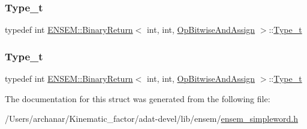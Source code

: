 \mbox{\label{structENSEM_1_1BinaryReturn_3_01int_00_01int_00_01OpBitwiseAndAssign_01_4_a0dd17e33f27d41964bcaa781f8d58aca}} 
\subsubsection{\texorpdfstring{Type\_t}{Type\_t}\hspace{0.1cm}{\footnotesize\ttfamily [2/3]}}
{\footnotesize\ttfamily typedef int \mbox{\hyperlink{structENSEM_1_1BinaryReturn}{E\+N\+S\+E\+M\+::\+Binary\+Return}}$<$ int, int, \mbox{\hyperlink{structENSEM_1_1OpBitwiseAndAssign}{Op\+Bitwise\+And\+Assign}} $>$\+::\mbox{\hyperlink{structENSEM_1_1BinaryReturn_3_01int_00_01int_00_01OpBitwiseAndAssign_01_4_a0dd17e33f27d41964bcaa781f8d58aca}{Type\+\_\+t}}}

\mbox{\label{structENSEM_1_1BinaryReturn_3_01int_00_01int_00_01OpBitwiseAndAssign_01_4_a0dd17e33f27d41964bcaa781f8d58aca}} 
\subsubsection{\texorpdfstring{Type\_t}{Type\_t}\hspace{0.1cm}{\footnotesize\ttfamily [3/3]}}
{\footnotesize\ttfamily typedef int \mbox{\hyperlink{structENSEM_1_1BinaryReturn}{E\+N\+S\+E\+M\+::\+Binary\+Return}}$<$ int, int, \mbox{\hyperlink{structENSEM_1_1OpBitwiseAndAssign}{Op\+Bitwise\+And\+Assign}} $>$\+::\mbox{\hyperlink{structENSEM_1_1BinaryReturn_3_01int_00_01int_00_01OpBitwiseAndAssign_01_4_a0dd17e33f27d41964bcaa781f8d58aca}{Type\+\_\+t}}}



The documentation for this struct was generated from the following file\+:\begin{DoxyCompactItemize}
\item 
/\+Users/archanar/\+Kinematic\+\_\+factor/adat-\/devel/lib/ensem/\mbox{\hyperlink{adat-devel_2lib_2ensem_2ensem__simpleword_8h}{ensem\+\_\+simpleword.\+h}}\end{DoxyCompactItemize}
